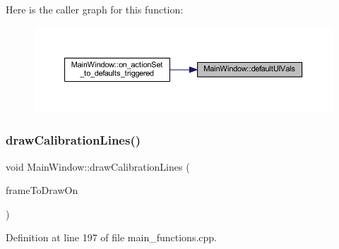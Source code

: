 Here is the caller graph for this function\+:
\nopagebreak
\begin{figure}[H]
\begin{center}
\leavevmode
\includegraphics[width=350pt]{classMainWindow_a6021f4624cf5aa8ced6b210d388ac31d_icgraph}
\end{center}
\end{figure}
\mbox{\label{classMainWindow_a46d10bf790a404b85083416112d51c08}} 
\subsubsection{\texorpdfstring{drawCalibrationLines()}{drawCalibrationLines()}}
{\footnotesize\ttfamily void Main\+Window\+::draw\+Calibration\+Lines (\begin{DoxyParamCaption}\item[{Q\+Pixmap $\ast$}]{frame\+To\+Draw\+On }\end{DoxyParamCaption})\hspace{0.3cm}{\ttfamily [private]}}



Definition at line 197 of file main\+\_\+functions.\+cpp.

